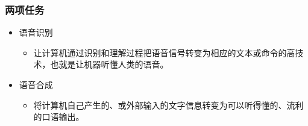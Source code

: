 \documentclass{beamer}
\newcommand{\fullPageImage}[2]{
	{
		\usebackgroundtemplate{\texttt{[image: \#1]}}
		\frame[plain]{#2}
	}
}
\begin{document}
\begin{frame}
	\frametitle{两项任务}
	\begin{itemize}
		\item 语音识别
		\begin{itemize}
			\item 让计算机通过识别和理解过程把语音信号转变为相应的文本或命令的高技术，也就是让机器听懂人类的语音。
		\end{itemize}
		\item 语音合成
		\begin{itemize}
			\item 将计算机自己产生的、或外部输入的文字信息转变为可以听得懂的、流利的口语输出。
		\end{itemize}
	\end{itemize}
\end{frame}


%
%

\fullPageImage{images/voice-recognition-principle.jpg}{\transwipe}%
\fullPageImage{images/voice-recognition-overview.eps}{\transwipe}%
\fullPageImage{images/voice-recognition-demo.jpg}{\transwipe}

\fullPageImage{images/schema_tts_work.jpg}{\transwipe}%
\end{document}
